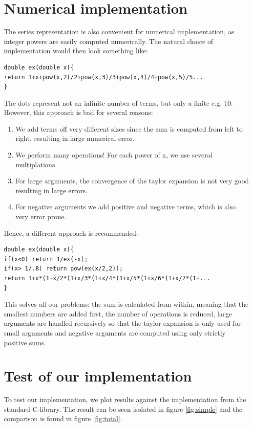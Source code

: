 \documentclass{article}
\begin{document}
\section{Numerical implementation}
The series representation is also convenient for numerical implementation, as integer powers are easily computed numerically. The natural choice of implementation would then look something like:

\begin{lstlisting}
double ex(double x){
return 1+x+pow(x,2)/2+pow(x,3)/3+pow(x,4)/4+pow(x,5)/5...
}
\end{lstlisting}

The dots represent not an infinite number of terms, but only a finite e.g. 10. However, this approach is bad for several reasons:
\begin{enumerate}
	\item We add terms off very different sizes since the sum is computed from left to right, resulting in large numerical error.
	\item We perform many operations! For each power of x, we use several multiplations.
	\item For large arguments, the convergence of the taylor expansion is not very good resulting in large errors.
	\item For negative arguments we add positive and negative terms, which is also very error prone. 

\end{enumerate}
Hence, a different approach is recommended:

		\begin{lstlisting}
double ex(double x){
if(x<0) return 1/ex(-x);
if(x> 1/.8) return pow(ex(x/2,2));
return 1+x*(1+x/2*(1+x/3*(1+x/4*(1+x/5*(1+x/6*(1+x/7*(1+...
}
		\end{lstlisting}

This solves all our problems: the sum is calculated from within, meaning that the smallest numbers are added first, the number of operations is reduced, large arguments are handled recursively so that the taylor expansion is only used for small arguments and negative arguments are computed using only strictly positive sums. 

\section{Test of our implementation}
To test our implementation, we plot results against the implementation from the standard C-library. The result can be seen isolated in figure \ref{fig:simple} and the comparison is found in figure \ref{fig:total}.
\end{document}
